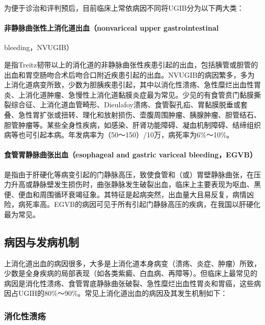 为便于诊治和评判预后，目前临床上常依病因不同将UGIB分为以下两大类：

\paragraph{非静脉曲张性上消化道出血（nonvariceal upper gastrointestinal}
bleeding，NVUGIB）

是指Treitz韧带以上的消化道的非静脉曲张性疾患引起的出血，包括胰管或胆管的出血和胃空肠吻合术后吻合口附近疾患引起的出血。NVUGIB的病因繁多，多为上消化道病变所致，少数为胆胰疾患引起，其中以消化性溃疡、急性糜烂出血性胃炎、上消化道肿瘤、急慢性上消化道黏膜炎症最为常见。少见的有食管贲门黏膜撕裂综合征、上消化道血管畸形、Dieulafoy溃疡、食管裂孔疝、胃黏膜脱垂或套叠、急性胃扩张或扭转、理化和放射损伤、壶腹周围肿瘤、胰腺肿瘤、胆管结石、胆管肿瘤等。某些全身性疾病，如感染、肝肾功能障碍、凝血机制障碍、结缔组织病等也可引起本病。年发病率为（50～150）/10万，病死率为6\%～10\%。

\paragraph{食管胃静脉曲张出血（esophageal and gastric variceal bleeding，EGVB）}

是指由于肝硬化等病变引起的门静脉高压，致使食管和（或）胃壁静脉曲张，在压力升高或静脉壁发生损伤时，曲张静脉发生破裂出血，临床上主要表现为呕血、黑便、便血和周围循环衰竭征象。其特征是起病突然，出血量大且易反复，病情凶险，病死率高。EGVB的病因可见于所有引起门静脉高压的疾病，在我国以肝硬化最为常见。

\subsection{病因与发病机制}

上消化道出血的病因很多，大多是上消化道本身病变（溃疡、炎症、肿瘤）所致，少数是全身疾病的局部表现（如各类紫癜、白血病、再障等）。但临床上最常见的病因是消化性溃疡、食管胃底静脉曲张破裂、急性糜烂出血性胃炎和胃癌，这些病因占UGIH的80\%～90\%。常见上消化道出血的病因及其发生机制如下：

\subsubsection{消化性溃疡}

